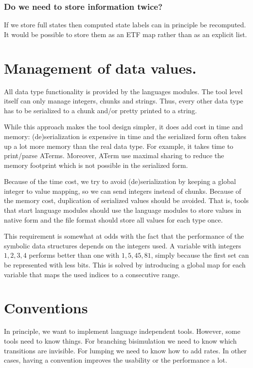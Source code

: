 \subsubsection{Do we need to store information twice?}

If we store full states then computed state labels can in principle be recomputed.
It would be possible to store them as an ETF map rather than as an explicit list.

\section{Management of data values.}

All data type functionality is provided by the languages modules.
The tool level itself can only manage integers, chunks and strings.
Thus, every other data type has to be serialized to a chunk
and/or pretty printed to a string.

While this approach makes the tool design simpler, it does add cost
in time and memory: (de)serialization is expensive in time and the
serialized form often takes up a lot more memory than the real data
type. For example, it takes time to print/parse ATerms. Moreover,
ATerm use maximal sharing to reduce the memory footprint which is not
possible in the serialized form.

Because of the time cost, we try to avoid (de)serialization by
keeping a global integer to value mapping, so we can send integers
instead of chunks. Because of the memory cost, duplication of
serialized values should be avoided. That is, tools that start language
modules should use the language modules to store values in native form
and the file format should store all values for each type once.

This requirement is somewhat at odds with the fact that the performance
of the symbolic data structures depends on the integers used.
A variable with integers $1,2,3,4$ performs better than one with
$1,5,45,81$, simply because the first set can be represented with less bits.
This is solved by introducing a global map for each variable that maps
the used indices to a consecutive range.


\section{Conventions}

In principle, we want to implement language independent tools.
However, some tools need to know things. For branching bisimulation
we need to know which transitions are invisible. For lumping we
need to know how to add rates. In other cases, having a convention
improves the usability or the performance a lot.

